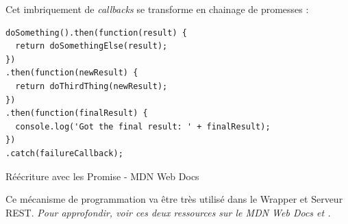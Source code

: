 \documentclass[a4paper, 12pt]{article}
\newenvironment{code}{\captionsetup{type=listing}}{}
\begin{document}
Cet imbriquement de \textit{callbacks} se transforme en chainage de promesses : \\
\begin{code}
    \begin{verbatim}
doSomething().then(function(result) {
  return doSomethingElse(result);
})
.then(function(newResult) {
  return doThirdThing(newResult);
})
.then(function(finalResult) {
  console.log('Got the final result: ' + finalResult);
})
.catch(failureCallback);
    \end{verbatim}
    \caption{Réécriture avec les Promise - MDN Web Docs \cite{ref102}}
\end{code}
Ce mécanisme de programmation va être très utilisé dans le Wrapper et Serveur REST.
\textit{Pour approfondir, voir ces deux ressources sur le MDN Web Docs \cite{ref100} et \cite{ref102}.}
\end{document}

